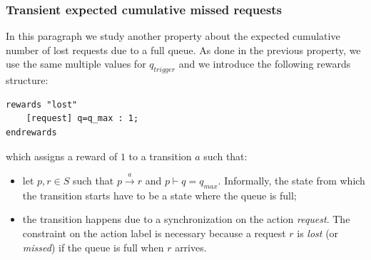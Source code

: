 \subsubsection{Transient expected cumulative missed requests }
In this paragraph we study another property about the expected
cumulative number of lost requests due to a full queue. As done in the
previous property, we use the same multiple values for $q_{trigger}$
and we introduce the following rewards structure:
\begin{verbatim}
rewards "lost"
	[request] q=q_max : 1;
endrewards
\end{verbatim}
which assigns a reward of $1$ to a transition $a$ such that:
\begin{itemize}
\item let $p, r \in S$ such that $ p \xrightarrow{a} r$ and $p \vdash
  q= q_{max}$. Informally, the state from which the transition starts
  have to be a state where the queue is full;
\item the transition happens due to a synchronization on the action
  \emph{request}. The constraint on the action label is necessary
  because a request $r$ is \emph{lost} (or \emph{missed}) if the queue
  is full when $r$ arrives.
\end{itemize}

